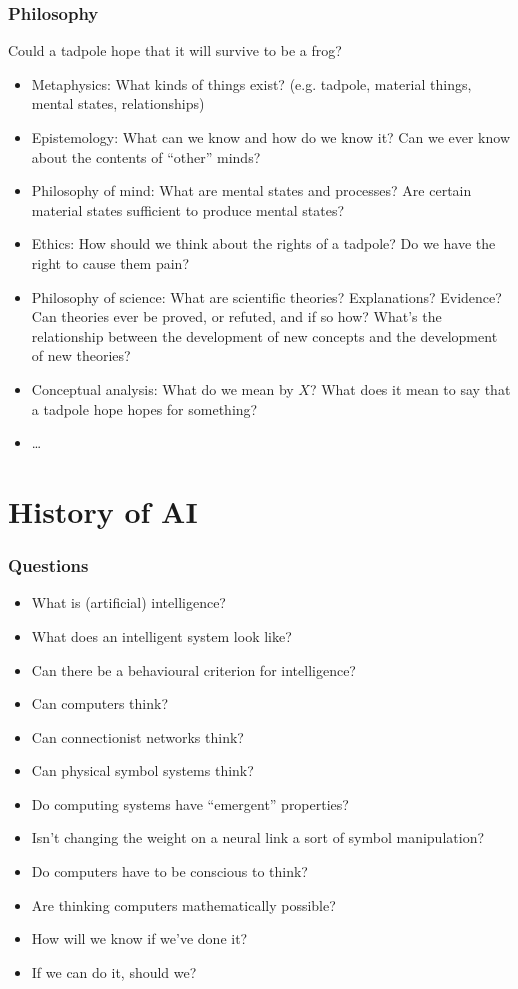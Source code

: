 \documentclass[UTF8,11pt,colorlinks,compress,openany]{beamer}%
\begin{document}
\begin{frame}\frametitle{Philosophy}
\begin{center}
Could a tadpole hope that it will survive to be a frog?
\end{center}
\begin{itemize}
	\item Metaphysics: What kinds of things exist? (e.g. tadpole, material things, mental states, relationships)
	\item Epistemology: What can we know and how do we know it? Can we ever know about the contents of ``other'' minds?
	\item Philosophy of mind: What are mental states and processes? Are certain material states sufficient to produce mental states?
	\item Ethics: How should we think about the rights of a tadpole? Do we have the right to cause them pain?
	\item Philosophy of science: What are scientific theories? Explanations? Evidence? Can theories ever be proved, or refuted, and if so how? What's the relationship between the development of new concepts and the development of new theories?
	\item Conceptual analysis: What do we mean by $X$? What does it mean to say that a tadpole hope hopes for something?
	\item \dots
\end{itemize}
\end{frame}

\section{History of AI}

\begin{frame}\frametitle{Questions}
\begin{itemize}
	\item What is (artificial) intelligence?
	\item What does an intelligent system look like?
	\item Can there be a behavioural criterion for intelligence?
	\item Can computers think?
	\item Can connectionist networks think?
	\item Can physical symbol systems think?
	\item Do computing systems have ``emergent'' properties?
	\item Isn't changing the weight on a neural
link a sort of symbol manipulation?
	\item Do computers have to be conscious to think?
	\item Are thinking computers mathematically possible?
	\item How will we know if we've done it?
	\item If we can do it, should we?
\end{itemize}
\end{frame}
\end{document}

